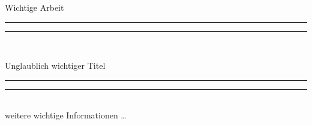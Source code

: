 
\begin{titlepage}
    \doublespacing
    \scshape
    \begin{center}
        \begin{large}
            Wichtige Arbeit\\[\baselineskip]
        \end{large}
        \rule{\textwidth}{1.6pt}\vspace*{-\baselineskip}\vspace*{2pt}
        \rule{\textwidth}{0.4pt}\\[0.6\baselineskip]
        \begin{LARGE}
            Unglaublich wichtiger Titel
        \end{LARGE}
        \rule{\textwidth}{0.4pt}\vspace*{-\baselineskip}\vspace{3.2pt}
        \rule{\textwidth}{1.6pt}\\[3\baselineskip]
        \normalfont
        weitere wichtige Informationen \ldots
    \end{center}
\end{titlepage}
